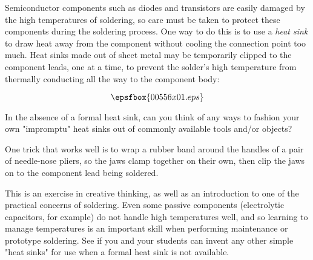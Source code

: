 

Semiconductor components such as diodes and transistors are easily damaged by the high temperatures of soldering, so care must be taken to protect these components during the soldering process.  One way to do this is to use a {\it heat sink} to draw heat away from the component without cooling the connection point too much.  Heat sinks made out of sheet metal may be temporarily clipped to the component leads, one at a time, to prevent the solder's high temperature from thermally conducting all the way to the component body:

$$\epsfbox{00556x01.eps}$$

In the absence of a formal heat sink, can you think of any ways to fashion your own "impromptu" heat sinks out of commonly available tools and/or objects?







One trick that works well is to wrap a rubber band around the handles of a pair of needle-nose pliers, so the jaws clamp together on their own, then clip the jaws on to the component lead being soldered.







This is an exercise in creative thinking, as well as an introduction to one of the practical concerns of soldering.  Even some passive components (electrolytic capacitors, for example) do not handle high temperatures well, and so learning to manage temperatures is an important skill when performing maintenance or prototype soldering.  See if you and your students can invent any other simple "heat sinks" for use when a formal heat sink is not available.




